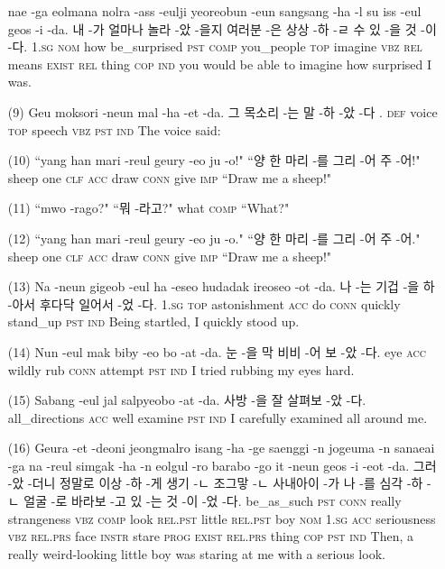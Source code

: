 \begin{itemize}
\tgl
		{nae -ga eolmana nolra -ass -eulji yeoreobun -eun sangsang -ha -l su iss -eul geos -i -da.}
		{내 -가 얼마나 놀라 -았 -을지 여러분 -은 상상 -하 -ㄹ 수 있 -을 것 -이 -다.}
		{\textsc{1.sg}	\textsc{nom}	how	be\_surprised	\textsc{pst}	\textsc{comp}	you\_people	\textsc{top}	imagine	\textsc{vbz}	\textsc{rel}	means	\textsc{exist}	\textsc{rel}	thing	\textsc{cop}	\textsc{ind}}
		{you would be able to imagine how surprised I was.}
		

\item [(9)]
\tgl
		{Geu moksori -neun mal -ha -et -da.}
		{그 목소리 -는 말 -하 -았 -다 .}
		{\textsc{def}	voice	\textsc{top}	speech	\textsc{vbz}	\textsc{pst}	\textsc{ind}}
		{The voice said:}
		
\item [(10)]
\tgl
		{``yang han mari -reul geury -eo ju -o!"}
		{``양 한 마리 -를 그리 -어 주 -어!"}
		{sheep	one	\textsc{clf}	\textsc{acc}	draw	\textsc{conn}	give	\textsc{imp}}
		{``Draw me a sheep!"}

\item [(11)]
\tgl
		{``mwo -rago?"}
		{``뭐 -라고?"}
		{what	\textsc{comp}}
		{``What?"}
		
\item [(12)]
\tgl
		{``yang han mari -reul geury -eo ju -o."}
		{``양 한 마리 -를 그리 -어 주 -어."}
		{sheep	one	\textsc{clf}	\textsc{acc}	draw	\textsc{conn}	give	\textsc{imp}}
		{``Draw me a sheep!"}
		
\item [(13)]
\tgl
		{Na -neun gigeob -eul ha -eseo hudadak ireoseo -ot -da.}
		{나 -는 기겁 -을 하 -아서 후다닥 일어서 -었 -다.}
		{\textsc{1.sg}	\textsc{top}	astonishment	\textsc{acc}	do	\textsc{conn}	quickly	stand\_up	\textsc{pst}	\textsc{ind}}
		{Being startled, I quickly stood up.}
		
\item [(14)]
\tgl
		{Nun -eul mak biby -eo bo -at -da.}
		{눈 -을 막 비비 -어 보 -았 -다.}
		{eye	\textsc{acc}	wildly	rub	\textsc{conn}	attempt	\textsc{pst}	\textsc{ind}}
		{I tried rubbing my eyes hard.}
		
\item [(15)]
\tgl
		{Sabang -eul jal salpyeobo -at -da.}
		{사방 -을 잘 살펴보 -았 -다.}
		{all\_directions	\textsc{acc}	well	examine	\textsc{pst}	\textsc{ind}}
		{I carefully examined all around me.}
		
\item [(16)]
\tgl
		{Geura -et -deoni jeongmalro isang -ha -ge saenggi -n jogeuma -n sanaeai -ga na -reul simgak -ha -n eolgul -ro barabo -go it -neun geos -i -eot -da.}
		{그러 -았 -더니 정말로 이상 -하 -게 생기 -ㄴ 조그맣 -ㄴ 사내아이 -가 나 -를 심각 -하 -ㄴ 얼굴 -로 바라보 -고 있 -는 것 -이 -었 -다.}
		{be\_as\_such	\textsc{pst}	\textsc{conn}	really	strangeness	\textsc{vbz}	\textsc{comp}	look	\textsc{rel.pst}	little	\textsc{rel.pst}	boy	\textsc{nom}	\textsc{1.sg}	\textsc{acc}	seriousness	\textsc{vbz}	\textsc{rel.prs}	face	\textsc{instr}	stare	\textsc{prog}	\textsc{exist}	\textsc{rel.prs}	thing	\textsc{cop}	\textsc{pst}	\textsc{ind}}
		{Then, a really weird-looking little boy was staring at me with a serious look.}
		

\end{itemize}
